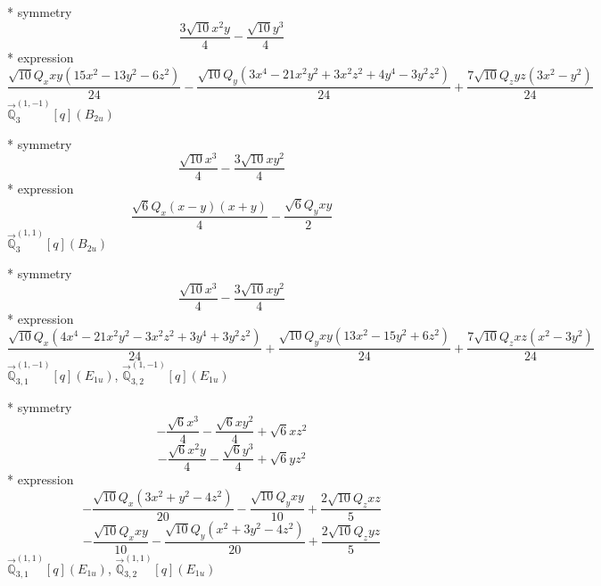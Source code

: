 \documentclass[fleqn,8pt]{jsarticle}
\begin{document}
\noindent\quad ** symmetry
\begin{dmath*}
\frac{3 \sqrt{10} x^{2} y}{4} - \frac{\sqrt{10} y^{3}}{4}
\end{dmath*}
\noindent\quad ** expression
\begin{dmath*}
\frac{\sqrt{10} Q_{x} x y \left(15 x^{2} - 13 y^{2} - 6 z^{2}\right)}{24} - \frac{\sqrt{10} Q_{y} \left(3 x^{4} - 21 x^{2} y^{2} + 3 x^{2} z^{2} + 4 y^{4} - 3 y^{2} z^{2}\right)}{24} + \frac{7 \sqrt{10} Q_{z} y z \left(3 x^{2} - y^{2}\right)}{24}
\end{dmath*}
\noindent\quad $\vec{\mathbb{Q}}_{3}^{(1,-1)}[q](B_{2u})$

\noindent\quad ** symmetry
\begin{dmath*}
\frac{\sqrt{10} x^{3}}{4} - \frac{3 \sqrt{10} x y^{2}}{4}
\end{dmath*}
\noindent\quad ** expression
\begin{dmath*}
\frac{\sqrt{6} Q_{x} \left(x - y\right) \left(x + y\right)}{4} - \frac{\sqrt{6} Q_{y} x y}{2}
\end{dmath*}
\noindent\quad $\vec{\mathbb{Q}}_{3}^{(1,1)}[q](B_{2u})$

\noindent\quad ** symmetry
\begin{dmath*}
\frac{\sqrt{10} x^{3}}{4} - \frac{3 \sqrt{10} x y^{2}}{4}
\end{dmath*}
\noindent\quad ** expression
\begin{dmath*}
\frac{\sqrt{10} Q_{x} \left(4 x^{4} - 21 x^{2} y^{2} - 3 x^{2} z^{2} + 3 y^{4} + 3 y^{2} z^{2}\right)}{24} + \frac{\sqrt{10} Q_{y} x y \left(13 x^{2} - 15 y^{2} + 6 z^{2}\right)}{24} + \frac{7 \sqrt{10} Q_{z} x z \left(x^{2} - 3 y^{2}\right)}{24}
\end{dmath*}
\noindent\quad $\vec{\mathbb{Q}}_{3,1}^{(1,-1)}[q](E_{1u})$, $\vec{\mathbb{Q}}_{3,2}^{(1,-1)}[q](E_{1u})$

\noindent\quad ** symmetry
\begin{dmath*}
- \frac{\sqrt{6} x^{3}}{4} - \frac{\sqrt{6} x y^{2}}{4} + \sqrt{6} x z^{2}
\end{dmath*}
\begin{dmath*}
- \frac{\sqrt{6} x^{2} y}{4} - \frac{\sqrt{6} y^{3}}{4} + \sqrt{6} y z^{2}
\end{dmath*}
\noindent\quad ** expression
\begin{dmath*}
- \frac{\sqrt{10} Q_{x} \left(3 x^{2} + y^{2} - 4 z^{2}\right)}{20} - \frac{\sqrt{10} Q_{y} x y}{10} + \frac{2 \sqrt{10} Q_{z} x z}{5}
\end{dmath*}
\begin{dmath*}
- \frac{\sqrt{10} Q_{x} x y}{10} - \frac{\sqrt{10} Q_{y} \left(x^{2} + 3 y^{2} - 4 z^{2}\right)}{20} + \frac{2 \sqrt{10} Q_{z} y z}{5}
\end{dmath*}
\noindent\quad $\vec{\mathbb{Q}}_{3,1}^{(1,1)}[q](E_{1u})$, $\vec{\mathbb{Q}}_{3,2}^{(1,1)}[q](E_{1u})$
\end{document}
